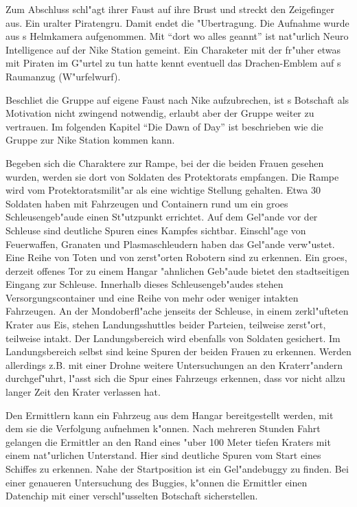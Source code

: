 Zum Abschluss schl"agt \xl{} ihrer Faust auf ihre Brust und streckt den Zeigefinger aus. Ein uralter Piratengru\3. Damit endet die "Ubertragung. Die Aufnahme wurde aus \ml{}s Helmkamera aufgenommen. Mit "`dort wo alles geannt"' ist nat"urlich Neuro Intelligence auf der Nike Station gemeint. Ein Charaketer mit der fr"uher etwas mit Piraten im G"urtel zu tun hatte kennt eventuell das Drachen-Emblem auf \xl{}s Raumanzug (W"urfelwurf).

Beschlie\3t die Gruppe auf eigene Faust nach Nike aufzubrechen, ist \xl{}s Botschaft als Motivation nicht zwingend notwendig, erlaubt aber der Gruppe \xl{} weiter zu vertrauen. Im folgenden Kapitel "`Die Dawn of Day"' ist beschrieben wie die Gruppe zur Nike Station kommen kann.

Begeben sich die Charaktere zur Rampe, bei der die beiden Frauen gesehen wurden, werden sie dort von Soldaten des Protektorats empfangen. Die Rampe wird vom Protektoratsmilit"ar als eine wichtige Stellung gehalten. Etwa 30 Soldaten haben mit Fahrzeugen und Containern rund um ein gro\3es Schleusengeb"aude einen St"utzpunkt errichtet. Auf dem Gel"ande vor der Schleuse sind deutliche Spuren eines Kampfes sichtbar. Einschl"age von Feuerwaffen, Granaten und Plasmaschleudern haben das Gel"ande verw"ustet. Eine Reihe von Toten und von zerst"orten Robotern sind zu erkennen. Ein gro\3es, derzeit offenes Tor zu einem Hangar "ahnlichen Geb"aude bietet den stadtseitigen Eingang zur Schleuse. Innerhalb dieses Schleusengeb"audes stehen Versorgungscontainer und eine Reihe von mehr oder weniger intakten Fahrzeugen. An der Mondoberfl"ache jenseits der Schleuse, in einem zerkl"ufteten Krater aus Eis, stehen Landungsshuttles beider Parteien, teilweise zerst"ort, teilweise intakt. Der Landungsbereich wird ebenfalls von Soldaten gesichert. Im Landungsbereich selbst sind keine Spuren der beiden Frauen zu erkennen. Werden allerdings z.B. mit einer Drohne weitere Untersuchungen an den Kraterr"andern durchgef"uhrt, l"asst sich die Spur eines Fahrzeugs erkennen, dass vor nicht allzu langer Zeit den Krater verlassen hat. 

Den Ermittlern kann ein Fahrzeug aus dem Hangar bereitgestellt werden, mit dem sie die Verfolgung aufnehmen k"onnen. Nach mehreren Stunden Fahrt gelangen die Ermittler an den Rand eines "uber 100 Meter tiefen Kraters mit einem nat"urlichen Unterstand. Hier sind deutliche Spuren vom Start eines Schiffes zu erkennen. Nahe der Startposition ist ein Gel"andebuggy zu finden. Bei einer genaueren Untersuchung des Buggies, k"onnen die Ermittler einen Datenchip mit einer verschl"usselten Botschaft sicherstellen.

